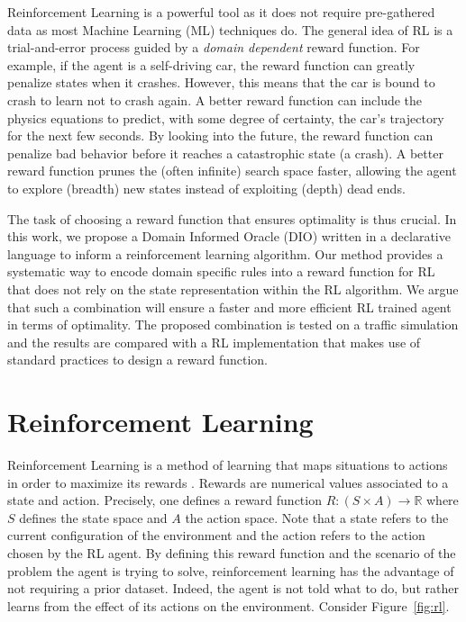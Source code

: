 \documentclass[a4paper,11pt]{article}
\theoremstyle{definition}
\begin{document}
\medskip

Reinforcement Learning is a powerful tool as it does not require
pre-gathered data as most Machine Learning (ML) techniques do. 
%
The general idea of RL is a trial-and-error process guided by a
\textit{domain dependent} reward function.
%
For example, if the agent is a self-driving car, the reward function
can greatly penalize states when it crashes.
%
However, this means that the car is bound to crash to learn not to
crash again.
%
A better reward function can include the physics equations to predict,
with some degree of certainty, the car's trajectory for the next few
seconds.
%
By looking into the future, the reward function can penalize bad
behavior before it reaches a catastrophic state (a crash).
%
A better reward function prunes the (often infinite) search space
faster, allowing the agent to explore (breadth) new states instead of
exploiting (depth) dead ends.
%

\medskip

The task of choosing a reward function that ensures optimality is thus
crucial. 
%
In this work, we propose a Domain Informed Oracle (DIO) written in a
declarative language to inform a reinforcement learning algorithm. 
%
Our method provides a systematic way to encode domain specific rules
into a reward function for RL that does not rely on the state
representation within the RL algorithm.
%
We argue that such a combination will ensure a faster and more
efficient RL trained agent in terms of optimality. 
%
The proposed combination is tested on a traffic simulation and the
results are compared with a RL implementation that makes use of
standard practices to design a reward function. 



\section{Reinforcement Learning} 

Reinforcement Learning is a method of learning that maps situations to
actions in order to maximize its rewards
\cite{sutton2018reinforcement}. Rewards are numerical values associated to a state and action. Precisely, one defines a reward function 
$R : (S \times A) \rightarrow \mathbb{R}$ where $S$ defines the state space and $A$ the action space. Note that a state refers to the current configuration
of the environment and the action refers to the action chosen by the RL agent. By defining this reward function and the scenario of the problem the agent is trying to solve, 
reinforcement learning has the advantage of not requiring a prior dataset. Indeed, the agent is not told what to do, but rather 
learns from the effect of its actions on the environment. Consider
Figure~\ref{fig:rl}. 
\end{document}
